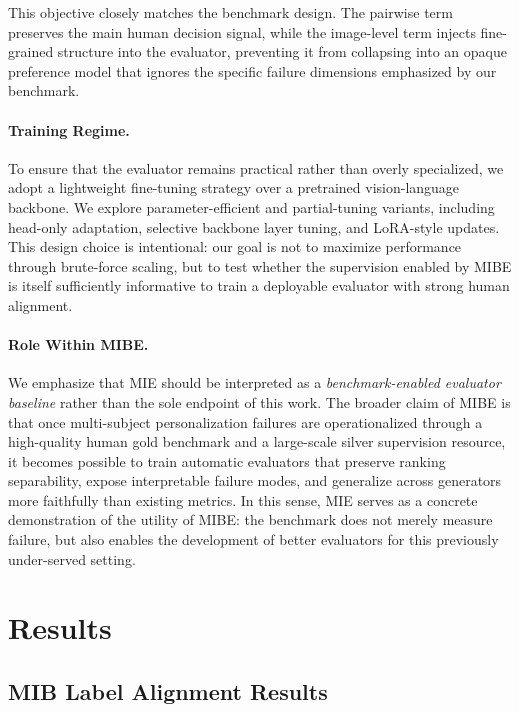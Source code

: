 \documentclass{article}
\begin{document}
This objective closely matches the benchmark design. The pairwise term preserves the main human decision signal, while the image-level term injects fine-grained structure into the evaluator, preventing it from collapsing into an opaque preference model that ignores the specific failure dimensions emphasized by our benchmark.

\paragraph{Training Regime.}
To ensure that the evaluator remains practical rather than overly specialized, we adopt a lightweight fine-tuning strategy over a pretrained vision-language backbone. We explore parameter-efficient and partial-tuning variants, including head-only adaptation, selective backbone layer tuning, and LoRA-style updates. This design choice is intentional: our goal is not to maximize performance through brute-force scaling, but to test whether the supervision enabled by MIBE is itself sufficiently informative to train a deployable evaluator with strong human alignment.

\paragraph{Role Within MIBE.}
We emphasize that MIE should be interpreted as a \emph{benchmark-enabled evaluator baseline} rather than the sole endpoint of this work. The broader claim of MIBE is that once multi-subject personalization failures are operationalized through a high-quality human gold benchmark and a large-scale silver supervision resource, it becomes possible to train automatic evaluators that preserve ranking separability, expose interpretable failure modes, and generalize across generators more faithfully than existing metrics. In this sense, MIE serves as a concrete demonstration of the utility of MIBE: the benchmark does not merely measure failure, but also enables the development of better evaluators for this previously under-served setting.








\section{Results}
\subsection{MIB Label Alignment Results}
\end{document}
